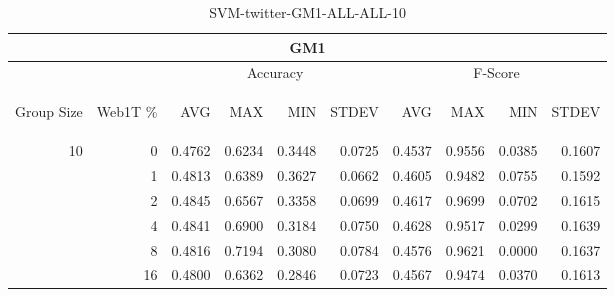 \begin{center}
\begin{table}[htbp] 
 \begin{center}
\begin{tabular}{ | r | r | r | r | r | r | r | r | r | r |}
\hline
\multicolumn{10}{|c|}{GM1}\\
\hline
 & & \multicolumn{4}{|c|}{Accuracy} & \multicolumn{4}{|c|}{F-Score}\\ \cline{3-10}
\begin{sideways}Group Size\end{sideways} & \begin{sideways}Web1T \%\end{sideways} & \begin{sideways}AVG\end{sideways} & \begin{sideways}MAX\end{sideways} & \begin{sideways}MIN\end{sideways} & \begin{sideways}STDEV\end{sideways} & \begin{sideways}AVG\end{sideways} & \begin{sideways}MAX\end{sideways} & \begin{sideways}MIN\end{sideways} & \begin{sideways}STDEV\end{sideways}\\
\hline
\multirow{5}{*}{10}
 & 0 & 0.4762 & 0.6234 & 0.3448 & 0.0725 & 0.4537 & 0.9556 & 0.0385 & 0.1607\\ \cline{2-10}
 & 1 & 0.4813 & 0.6389 & 0.3627 & 0.0662 & 0.4605 & 0.9482 & 0.0755 & 0.1592\\ \cline{2-10}
 & 2 & 0.4845 & 0.6567 & 0.3358 & 0.0699 & 0.4617 & 0.9699 & 0.0702 & 0.1615\\ \cline{2-10}
 & 4 & 0.4841 & 0.6900 & 0.3184 & 0.0750 & 0.4628 & 0.9517 & 0.0299 & 0.1639\\ \cline{2-10}
 & 8 & 0.4816 & 0.7194 & 0.3080 & 0.0784 & 0.4576 & 0.9621 & 0.0000 & 0.1637\\ \cline{2-10}
 & 16 & 0.4800 & 0.6362 & 0.2846 & 0.0723 & 0.4567 & 0.9474 & 0.0370 & 0.1613\\ \cline{2-10}
\hline
\end{tabular}
\caption{SVM-twitter-GM1-ALL-ALL-10}
\label{table:SVM-twitter-GM1-ALL-ALL-10}
\end{center}
 \end{table}
\end{center}

